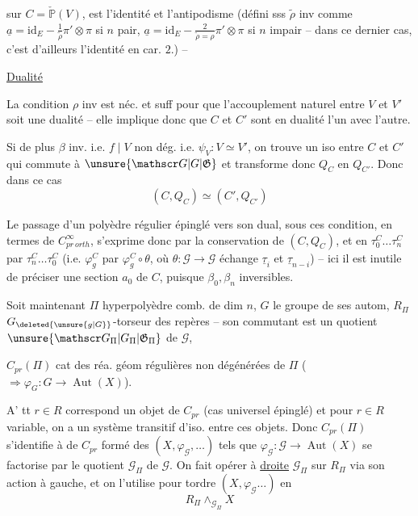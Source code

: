 
sur $C=\check{\mathbb P}(V)$, est l'identité et l'antipodisme (défini sss $\widetilde\rho$ inv  comme $\underline a=\mathrm{id}_E-\frac1{\widetilde\rho}\pi'\otimes\pi$ si $n$ pair, $\underline a=\mathrm{id}_E-\frac2{\widetilde\rho=\rho}\pi'\otimes\pi$ si $n$ impair -- dans ce dernier cas, c'est d'ailleurs l'identité en car. $2$.) --


\uline{Dualité} 

La condition $\rho$ inv est néc. et suff pour que l'accouplement naturel entre $V$ et $V'$ soit une dualité -- elle implique donc que $C$ et $C'$ sont en dualité l'un avec l'autre.

Si de plus $\beta$ inv. i.e.  $f\mid V$ non dég. i.e. $\psi_V:V\simeq V'$, on trouve un iso entre  $C$ et $C'$ qui commute à $\unsure{\mathscr G|G|\mathfrak G}$ et transforme donc $Q_C$ en $Q_{C'}$. Donc dans ce cas
\[
(C,Q_C)\simeq(C',Q_{C'})
\]

Le passage d'un polyèdre régulier  épinglé vers son dual, sous ces condition, en termes de $C^\infty_{pr\,orth}$, s'exprime donc par la conservation de $(C,Q_C)$, et en   $\tau_0^C\ldots\tau_n^C$ par $\tau_n^C\ldots\tau_0^C$ (i.e. $\varphi_g^C$ par $\varphi_g^C\circ\theta$, où $\theta:\mathscr G\longrightarrow\mathscr G$ échange $\underline\tau_i$ et $\underline\tau_{n-i}$) -- ici il est inutile de préciser une section $a_0$  de $C$,  puisque $\beta_0,\beta_n$ inversibles.


Soit maintenant $\Pi$ hyperpolyèdre comb. de dim $n$, $G$ le groupe de ses autom, $R_\Pi$ $G_{\deleted{\unsure{g|G}}}$-torseur des repères -- son commutant est un quotient $\unsure{\mathscr G_\Pi|G_\Pi|\mathfrak G_\Pi}$ de $\mathscr G$,

$C_{pr}(\Pi)$ cat des réa. géom régulières  non dégénérées de $\Pi$ ($\Rightarrow\varphi_G:G\longrightarrow\operatorname{Aut}(X)$).

A' tt $r\in R$ correspond un objet de $C_{pr}$ (cas universel épinglé) et pour $r\in R$ variable, on a un système transitif d'iso. entre ces objets. Donc $C_{pr}(\Pi)$ s'identifie  à    de $C_{pr}$ formé des $(X,\varphi_{\mathscr G},\ldots)$ tels que $\varphi_{\mathscr G}:\mathscr G\longrightarrow\operatorname{Aut}(X)$ se factorise par le quotient $\mathscr G_\Pi$ de $\mathscr G$. On fait opérer à \uline{droite} $\mathscr G_\Pi$ sur $R_\Pi$ via son action à gauche, et on l'utilise pour tordre $(X,\varphi_{\mathscr G}\ldots)$ en
\[
R_\Pi\mathbin{\wedge_{\mathscr G_\Pi}} X
\]

